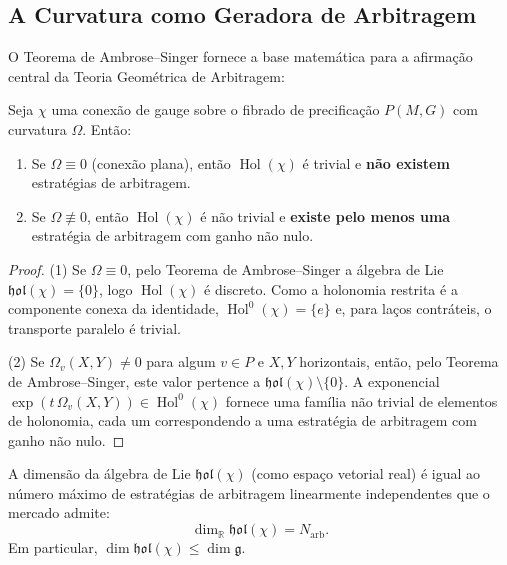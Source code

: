 \subsection{A Curvatura como Geradora de Arbitragem}

O Teorema de Ambrose--Singer fornece a base matem\'atica para a afirma\c{c}\~ao central da Teoria Geom\'etrica de Arbitragem:

\begin{teo}\label{teo:criterio-arbitragem}
Seja \(\chi\) uma conex\~ao de gauge sobre o fibrado de precifica\c{c}\~ao \(P(M,G)\) com curvatura \(\Omega\). Ent\~ao:
\begin{enumerate}
 \item Se \(\Omega \equiv 0\) (conex\~ao plana), ent\~ao \(\operatorname{Hol}(\chi)\) \'e trivial e \textbf{n\~ao existem} estrat\'egias de arbitragem.
 \item Se \(\Omega \not\equiv 0\), ent\~ao \(\operatorname{Hol}(\chi)\) \'e n\~ao trivial e \textbf{existe pelo menos uma} estrat\'egia de arbitragem com ganho n\~ao nulo.
\end{enumerate}
\end{teo}

\begin{proof}
(1) Se \(\Omega \equiv 0\), pelo Teorema de Ambrose--Singer a \'algebra de Lie \(\mathfrak{hol}(\chi) = \{0\}\), logo \(\operatorname{Hol}(\chi)\) \'e discreto. Como a holonomia restrita \'e a componente conexa da identidade, \(\operatorname{Hol}^0(\chi) = \{e\}\) e, para la\c{c}os contr\'ateis, o transporte paralelo \'e trivial.

(2) Se \(\Omega_v(X,Y) \neq 0\) para algum \(v \in P\) e \(X,Y\) horizontais, ent\~ao, pelo Teorema de Ambrose--Singer, este valor pertence a \(\mathfrak{hol}(\chi) \setminus \{0\}\). A exponencial \(\exp(t \,\Omega_v(X,Y)) \in \operatorname{Hol}^0(\chi)\) fornece uma fam\'ilia n\~ao trivial de elementos de holonomia, cada um correspondendo a uma estrat\'egia de arbitragem com ganho n\~ao nulo.
\end{proof}

\begin{prop}
A dimens\~ao da \'algebra de Lie \(\mathfrak{hol}(\chi)\) (como espa\c{c}o vetorial real) \'e igual ao n\'umero m\'aximo de estrat\'egias de arbitragem linearmente independentes que o mercado admite:
\begin{equation}\label{eq:dim-arbitragem}
 \dim_{\mathbb{R}} \mathfrak{hol}(\chi) = N_{\text{arb}}.
\end{equation}
Em particular, \(\dim \mathfrak{hol}(\chi) \leq \dim \mathfrak{g}\).
\end{prop}

